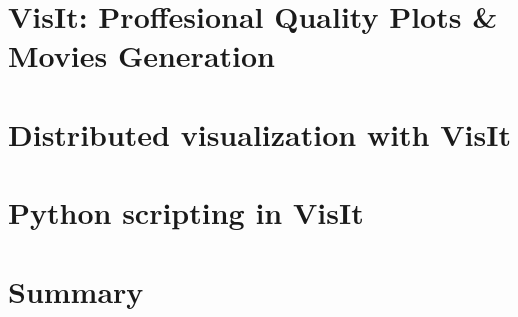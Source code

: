 \documentclass[xcolor=svgnames]{beamer}
\providecommand{\sectionpage}{\Large\centering \bf\mediumblue\insertsection}
\begin{document}
\section{VisIt: Proffesional Quality Plots \& Movies Generation}
\normEnv
\frame{\sectionpage}
 
\resetEnv

\section{Distributed visualization with VisIt}
\advEnv
\frame{\sectionpage}
 
\resetEnv

\section{Python scripting in VisIt}
\advEnv
\frame{\sectionpage}
 
\resetEnv

\section{Summary}
\frame{\sectionpage}
 
\end{document}
